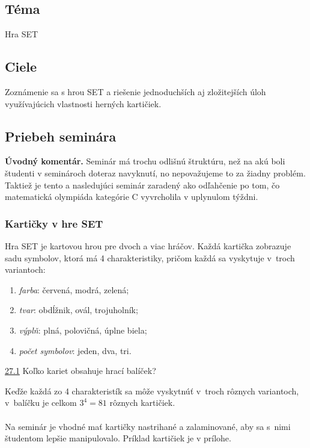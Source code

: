 

\subsection*{Téma}
Hra SET

\subsection*{Ciele}
Zoznámenie sa s hrou SET a riešenie jednoduchších aj zložitejších úloh využívajúcich vlastnosti herných kartičiek.

\subsection*{Priebeh seminára}

\textbf{Úvodný komentár.} Seminár má trochu odlišnú štruktúru, než na akú boli študenti v seminároch doteraz navyknutí, no nepovažujeme to za žiadny problém. Taktiež je tento a nasledujúci seminár zaradený ako odľahčenie po tom, čo matematická olympiáda kategórie C vyvrcholila v uplynulom týždni.

\subsubsection*{Kartičky v hre SET}

Hra SET je kartovou hrou pre dvoch a viac hráčov. Každá kartička zobrazuje sadu symbolov, ktorá má 4 charakteristiky, pričom každá sa vyskytuje v~troch variantoch:
\begin{enumerate}
\item \textit{farba}: červená, modrá, zelená;
\item  \textit{tvar}: obdĺžnik, ovál, trojuholník;
\item \textit{výplň}: plná, polovičná, úplne biela;
\item \textit{počet symbolov}: jeden, dva, tri.
\end{enumerate}

\begin{tcolorbox}[breakable,notitle,boxrule=0pt,colback=light-gray,colframe=light-gray]\ul{27.1} Koľko kariet obsahuje hrací balíček? \end{tcolorbox}
\rie Keďže každá zo 4 charakteristík sa môže vyskytnúť v~troch rôznych variantoch, v~balíčku je celkom $3^4=81$ rôznych kartičiek. \\
\\
\kom Na seminár je vhodné mať kartičky nastrihané a zalaminované, aby sa s~nimi študentom lepšie manipulovalo. Príklad kartičiek je v prílohe.

